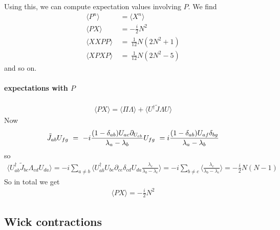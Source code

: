 \documentclass[a4paper,11pt]{article}
\numberwithin{equation}{section}
\begin{document}
%
Using this, we can compute expectation values involving $P$. We find
%
\begin{align}
    \langle P^n \rangle \ &= \langle X^n \rangle \\
    \langle PX \rangle \ &=  -\frac{i}{2}N^2 \\
    \langle XXPP \rangle \ &= \ \frac{1}{12} N(2N^2 + 1) \\
    \langle XPXP \rangle \ &= \ \frac{1}{12} N(2N^2 -5)
\end{align}
%
and so on.

\paragraph{expectations with $P$}

\begin{align}
    \langle PX \rangle = \langle \Pi \Lambda \rangle + \langle U^\dagger \tilde J \Lambda U \rangle
\end{align}
%
Now 
%
\begin{align}
    \tilde J_{ab} U_{fg} \ = \ - i\frac{ (1 - \delta_{ab}) U_{ac} \partial_{U_{cb}} } {\lambda_a - \lambda_b} U_{fg} \ = \-i  \frac{ (1 - \delta_{ab}) U_{af}  \delta_{bg}  } {\lambda_a - \lambda_b} 
\end{align}
%
so 
%
\begin{align}
    \langle U^\dagger_{ab} \tilde J_{bc} \Lambda_{cd} U_{da} \rangle = -i \sum_{a \neq b}\langle  U^\dagger_{ab} U_{be} \partial_{ce} \delta_{cd}  U_{da} \frac{ \lambda_c  } {\lambda_b - \lambda_c}  \rangle =  -i \sum_{b \neq c}\langle  \frac{ \lambda_c  } {\lambda_b - \lambda_c}  \rangle = -\frac{i}{2}N(N-1)
\end{align}
%
So in total we get 
\begin{align}
    \langle PX \rangle = -\frac{i}{2}N^2
\end{align}
%

\subsection{Wick contractions}
\end{document}
